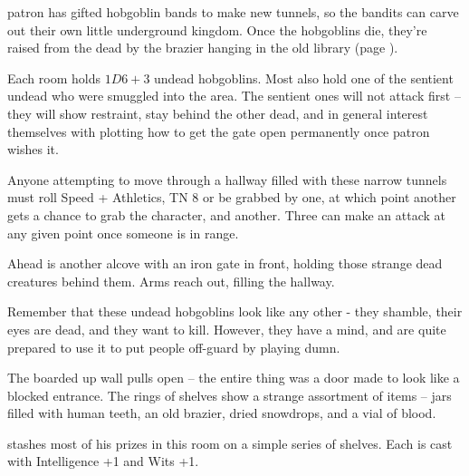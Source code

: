 \begin{multicols}{2}

\Gls{patron} has gifted hobgoblin bands to make new tunnels, so the bandits can carve out their own little underground kingdom.  Once the hobgoblins die, they're raised from the dead by the brazier hanging in the old library (page \pageref{oldlibrary}).

Each room holds $1D6+3$ undead hobgoblins.  Most also hold one of the sentient undead who were smuggled into the area.  The sentient ones will not attack first -- they will show restraint, stay behind the other dead, and in general interest themselves with plotting how to get the gate open permanently once \gls{patron} wishes it.

\huntingdog


Anyone attempting to move through a hallway filled with these narrow tunnels must roll Speed + Athletics, TN 8 or be grabbed by one, at which point another gets a chance to grab the character, and another.  Three can make an attack at any given point once someone is in range.

\begin{boxtext}

	Ahead is another alcove with an iron gate in front, holding those strange dead creatures behind them.  Arms reach out, filling the hallway.

\end{boxtext}

\undeadhobgoblin


Remember that these undead hobgoblins look like any other - they shamble, their eyes are dead, and they want to kill.
However, they have a mind, and are quite prepared to use it to put people off-guard by playing dumn.

\sentientundeadhobgoblin


\begin{boxtext}

	The boarded up wall pulls open -- the entire thing was a door made to look like a blocked entrance.  The rings of shelves show a strange assortment of items -- jars filled with human teeth, an old brazier, dried snowdrops, and a vial of blood.

\end{boxtext}

 stashes most of his prizes in this room on a simple series of shelves.  Each is cast with Intelligence +1 and Wits +1.


\end{multicols}

